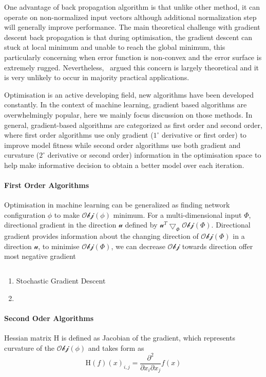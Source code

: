 One advantage of back propagation algorithm is that unlike other method, it can operate on non-normalized input vectors although additional normalization step will generally improve performance. \cite{Buckland:2002} The main theoretical challenge with gradient descent back propagation is that during optimisation, the gradient descent can stuck at local minimum and unable to reach the global minimum, this particularly concerning when error function is non-convex and the error surface is extremely rugged. Nevertheless,~\citet{LeCun_2015} argued this concern is largely theoretical and it is very unlikely to occur in majority practical applications.

Optimisation is an active developing field, new algorithms have been developed constantly. In the context of machine learning, gradient based algorithms are overwhelmingly popular, here we mainly focus discussion on those methods. In general, gradient-based algorithms are categorized as first order and second order, where first order algorithms use only gradient ($1^\circ$ derivative or first order) to improve model fitness while second order algorithms use both gradient and curvature ($2^\circ$ derivative or second order) information in the optimisation space to help make informative decision to obtain a better model over each iteration. \\

\paragraph {First Order Algorithms}
Optimisation in machine learning can be generalized as finding network configuration $\phi$ to make $\mathcal{Obj}(\phi)$ minimum. For a multi-dimensional input $\Phi$, directional gradient in the direction $\mathcal{u}$ defined by $\mathcal{u}^T\bigtriangledown_{\Phi}\mathcal{Obj}(\Phi)$. Directional gradient provides information about the changing direction of $\mathcal{Obj}(\Phi)$ in a direction $\mathcal{u}$, to minimise $\mathcal{Obj}(\Phi)$, we can decrease $\mathcal{Obj}$ towards direction offer most negative gradient 


\begin{equation}
    
\end{equation}

\begin{enumerate}
    \item Stochastic Gradient Descent \\
    \item \\
\end{enumerate}

\paragraph{Second Oder Algorithms}
Hessian matrix $\mathrm{H}$ is defined as Jacobian of the gradient, which represents curvature of the $\mathcal{Obj}(\phi)$ and takes form as 
\begin{equation}
    \mathrm{H}(f)(x)_{i,j} = \frac{\partial^2}{\partial x_i \partial x_j}f(x)
\end{equation}
